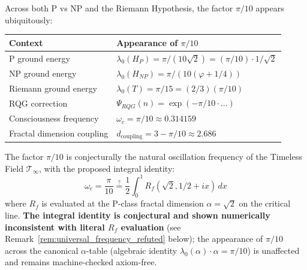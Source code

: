 Across both P vs NP and the Riemann Hypothesis, the factor $\pi/10$ appears ubiquitously:

\begin{center}
\begin{tabular}{ll}
\toprule
\textbf{Context} & \textbf{Appearance of $\pi/10$} \\
\midrule
P ground energy & $\lambda_0(H_P) = \pi/(10\sqrt{2}) = (\pi/10) \cdot 1/\sqrt{2}$ \\
NP ground energy & $\lambda_0(H_{NP}) = \pi/(10(\varphi + 1/4))$ \\
Riemann ground energy & $\lambda_0(T) = \pi/15 = (2/3)(\pi/10)$ \\
RQG correction & $\Psi_{RQG}(n) = \exp(-\pi/10 \cdot \ldots)$ \\
Consciousness frequency & $\omega_c = \pi/10 \approx 0.314159$ \\
Fractal dimension coupling & $d_{\text{coupling}} = 3 - \pi/10 \approx 2.686$ \\
\bottomrule
\end{tabular}
\end{center}

\begin{conjecture}
\label{thm:universal_frequency}
The factor $\pi/10$ is conjecturally the natural oscillation frequency of the Timeless Field $\mathcal{T}_\infty$, with the proposed integral identity:
\begin{equation}
\omega_c = \frac{\pi}{10} \stackrel{?}{=} \frac{1}{2} \int_0^1 R_f(\sqrt{2}, 1/2 + ix) \, dx
\end{equation}
where $R_f$ is evaluated at the P-class fractal dimension $\alpha = \sqrt{2}$ on the critical line. \textbf{The integral identity is conjectural and shown numerically inconsistent with literal $R_f$ evaluation} (see Remark~\ref{rem:universal_frequency_refuted} below); the appearance of $\pi/10$ across the canonical $\alpha$-table (algebraic identity $\lambda_0(\alpha)\cdot\alpha = \pi/10$) is unaffected and remains machine-checked axiom-free.
\end{conjecture}

